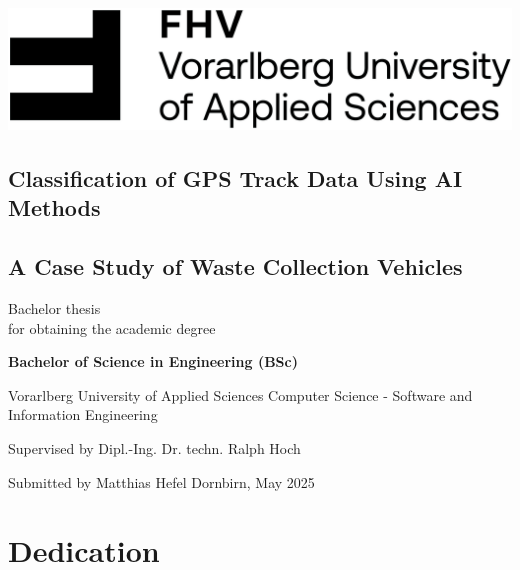 \documentclass[a4paper,12pt,twoside]{scrreprt}
\begin{document}
\cleardoublepage   %
\thispagestyle{empty}
\begin{titlepage}
  \begin{flushright}
  \includegraphics[width=0.4\linewidth]{Abbildungen/Wort-Bild-Marke-cmyk}  %
  \end{flushright}
  \begin{flushleft}
  \section*{Classification of GPS Track Data Using AI Methods}
  \subsection*{A Case Study of Waste Collection Vehicles}
  \vspace{1cm}

  Bachelor thesis\\
  for obtaining the academic degree
  \vspace{0.5cm}

  \textbf{Bachelor of Science in Engineering (BSc)}

  \vspace{1cm}
  Vorarlberg University of Applied Sciences\newline
  Computer Science - Software and Information Engineering

  \vspace{0.5cm}

  Supervised by\newline
  Dipl.-Ing. Dr. techn. Ralph Hoch

  \vspace{0.5cm}

  Submitted by\newline
  Matthias Hefel\newline
  Dornbirn, May 2025
  \end{flushleft}
\end{titlepage}


\newpage

\section*{Dedication}
\end{document}
